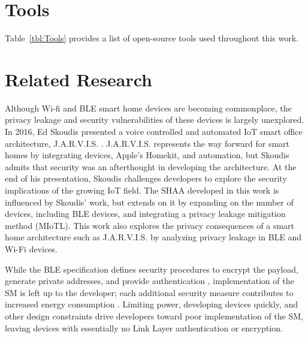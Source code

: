 \documentclass[12pt,letterpaper,oneside]{book}
\begin{document}
		\section{Tools}
		Table~\ref{tbl:Tools} provides a list of open-source tools used throughout this work.
		
		\tableTools
		
		\section{Related Research}
		Although Wi-fi and \ac{BLE} smart home devices are becoming commonplace, the privacy leakage and security vulnerabilities of these devices is largely unexplored. In 2016, Ed Skoudis presented a voice controlled and automated \ac{IoT} smart office architecture, J.A.R.V.I.S. \cite{Skoudis}. J.A.R.V.I.S. represents the way forward for smart homes by integrating devices, Apple's Homekit, and automation, but Skoudis admits that security was an afterthought in developing the architecture. At the end of his presentation, Skoudis challenges developers to explore the security implications of the growing \ac{IoT} field. The \acf{SHAA} developed in this work is influenced by Skoudis' work, but extends on it by expanding on the number of devices, including \ac{BLE} devices, and integrating a privacy leakage mitigation method (\ac{MIoTL}). This work also explores the privacy consequences of a smart home architecture such as J.A.R.V.I.S. by analyzing privacy leakage in \ac{BLE} and Wi-Fi devices. 
		
		While the \ac{BLE} specification defines security procedures to encrypt the payload, generate private addresses, and provide authentication \cite{sig4.2}, implementation of the \ac{SM} is left up to the developer; each additional security measure contributes to increased energy consumption \cite{rHeydon}. Limiting power, developing devices quickly, and other design constraints drive developers toward poor implementation of the \ac{SM}, leaving devices with essentially no Link Layer authentication or encryption. 
		
\end{document}
